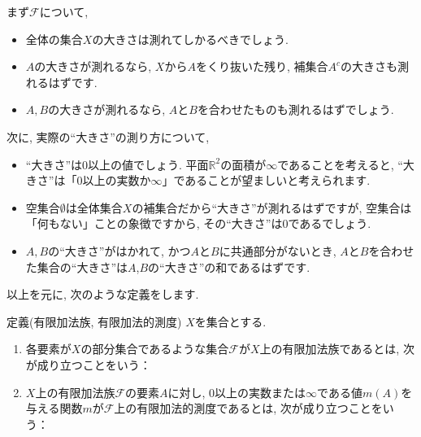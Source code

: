 \par まず$\mathcal{F}$について, 
\begin{itemize}
\item 全体の集合$X$の大きさは測れてしかるべきでしょう. 
\item $A$の大きさが測れるなら, $X$から$A$をくり抜いた残り, 補集合$A^c$の大きさも測れるはずです. 
\item $A,B$の大きさが測れるなら, $A$と$B$を合わせたものも測れるはずでしょう. 
\end{itemize}
\par 次に, 実際の“大きさ”の測り方について, 
\begin{itemize}
\item “大きさ”は0以上の値でしょう. 平面$\mathbb{R}^2$の面積が$\infty$であることを考えると, “大きさ”は「0以上の実数か$\infty$」であることが望ましいと考えられます. 
\item 空集合$\emptyset$は全体集合$X$の補集合だから“大きさ”が測れるはずですが, 空集合は「何もない」ことの象徴ですから, その“大きさ”は0であるでしょう. 
\item $A,B$の“大きさ”がはかれて, かつ$A$と$B$に共通部分がないとき, $A$と$B$を合わせた集合の“大きさ”は$A$,$B$の“大きさ”の和であるはずです. 
\end{itemize}
\par 以上を元に, 次のような定義をします. 
\begin{itembox}[l]{定義(有限加法族, 有限加法的測度)}
$X$を集合とする. 
\begin{enumerate}
\item 各要素が$X$の部分集合であるような集合$\mathcal{F}$が$X$上の有限加法族であるとは, 次が成り立つことをいう：
\item $X$上の有限加法族$\mathcal{F}$の要素$A$に対し, 0以上の実数または$\infty$である値$m(A)$を与える関数$m$が$\mathcal{F}$上の有限加法的測度であるとは, 次が成り立つことをいう：
\end{enumerate}
\end{itembox}
